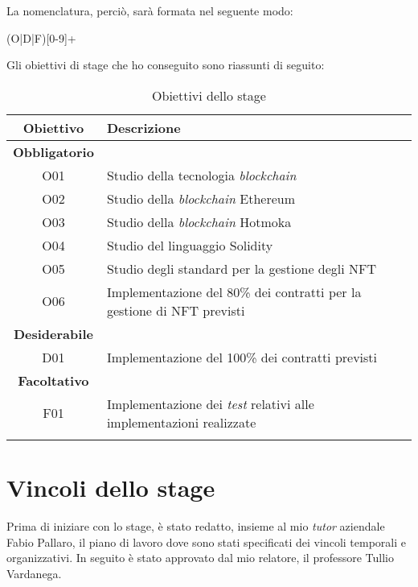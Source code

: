 \noindent La nomenclatura, perciò, sarà formata nel seguente modo:
\begin{center}
  (O|D|F)[0-9]+
\end{center}
\noindent Gli obiettivi di stage che ho conseguito sono riassunti di seguito:
\begin{longtable}{|c|l|}
  \hline

  \textbf{Obiettivo} & \textbf{Descrizione} \\ \hline

  \textbf{Obbligatorio} & \\

  O01       & Studio della tecnologia \textit{blockchain} \\
  O02       & Studio della \textit{blockchain} Ethereum \\
  O03       & Studio della \textit{blockchain} Hotmoka \\ 
  O04       & Studio del linguaggio Solidity \\ 
  O05       & Studio degli standard per la gestione degli NFT \\ 
  O06       & Implementazione del 80\% dei contratti per la gestione di NFT previsti \\
  
  \hline

  \textbf{Desiderabile} &  \\
  
  D01       & Implementazione del 100\% dei contratti previsti \\

  \hline

  \textbf{Facoltativo} & \\

  F01       & Implementazione dei \textit{test} relativi alle implementazioni realizzate \\

  \hline

  \caption{Obiettivi dello stage}

\end{longtable}


\section{Vincoli dello stage}
Prima di iniziare con lo stage, è stato redatto, insieme al mio \textit{tutor} aziendale Fabio Pallaro, il piano di lavoro dove sono stati specificati dei vincoli temporali e organizzativi. In seguito è stato approvato dal mio relatore, il professore Tullio Vardanega.

